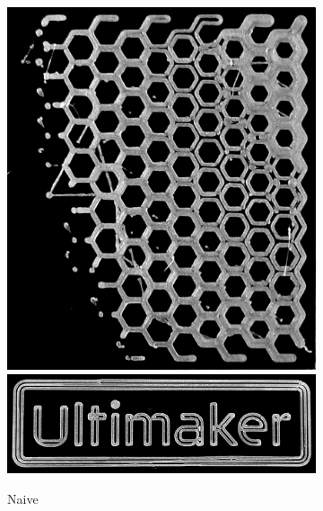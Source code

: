 \begin{figure}
\begin{subfigure}{\figwidth}
\includegraphics[height=\figheight]{sources/applications/P3_print_hex_naive_edited.png}
\includegraphics[width=\figwidth]{sources/applications/P3_print_UM_naive_edited.png}
\caption{Naive}\label{print_naive}
\end{subfigure}
\begin{subfigure}{\figwidth}\centering

\end{subfigure}
\end{figure}
